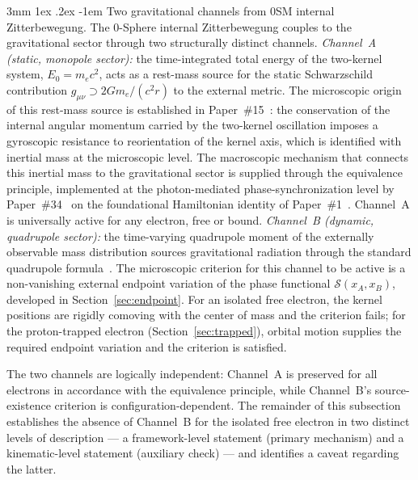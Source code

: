\documentclass[%
 reprint, amsmath,amssymb, aps, prd, ]{revtex4-2}
\makeatletter
\numberwithin{equation}{section}
\renewcommand\paragraph{%
  \@startsection{paragraph}{4}{\z@}%
    {3mm \@plus 1ex \@minus .2ex}%
    {-1em}%
    {\normalfont\normalsize\itshape}}
\makeatother
\begin{document}
\paragraph{Two gravitational channels from 0SM internal Zitterbewegung.}
The 0-Sphere internal Zitterbewegung couples to the gravitational sector through two structurally distinct channels.
\emph{Channel~A (static, monopole sector):} the time-integrated total energy of the two-kernel system, $E_0 = m_e c^2$, acts as a rest-mass source for the static Schwarzschild contribution $g_{\mu\nu} \supset 2 G m_e/(c^2 r)$ to the external metric. The microscopic origin of this rest-mass source is established in Paper~\#15~\cite{hanamura15}: the conservation of the internal angular momentum carried by the two-kernel oscillation imposes a gyroscopic resistance to reorientation of the kernel axis, which is identified with inertial mass at the microscopic level. The macroscopic mechanism that connects this inertial mass to the gravitational sector is supplied through the equivalence principle, implemented at the photon-mediated phase-synchronization level by Paper~\#34~\cite{hanamura34} on the foundational Hamiltonian identity of Paper~\#1~\cite{hanamura01}. Channel~A is universally active for any electron, free or bound.
\emph{Channel~B (dynamic, quadrupole sector):} the time-varying quadrupole moment of the externally observable mass distribution sources gravitational radiation through the standard quadrupole formula~\cite{Hartle2003, Peters1963}. The microscopic criterion for this channel to be active is a non-vanishing external endpoint variation of the phase functional $\mathcal{S}(x_A, x_B)$, developed in Section~\ref{sec:endpoint}. For an isolated free electron, the kernel positions are rigidly comoving with the center of mass and the criterion fails; for the proton-trapped electron (Section~\ref{sec:trapped}), orbital motion supplies the required endpoint variation and the criterion is satisfied.

The two channels are logically independent: Channel~A is preserved for all electrons in accordance with the equivalence principle, while Channel~B's source-existence criterion is configuration-dependent. The remainder of this subsection establishes the absence of Channel~B for the isolated free electron in two distinct levels of description --- a framework-level statement (primary mechanism) and a kinematic-level statement (auxiliary check) --- and identifies a caveat regarding the latter.
\end{document}
